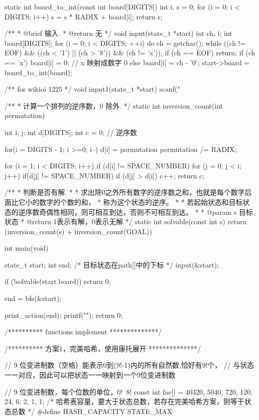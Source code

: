 \begin{Codex}[label=eight_digits_astar.c]
static int board_to_int(const int board[DIGITS]) {
    int i, s = 0;
    for (i = 0; i < DIGITS; i++)
        s = s * RADIX + board[i];
    return s;
}

/**
 * @brief 输入.
 * @return 无
 */
void input(state_t *start) {
    int ch, i;
    int board[DIGITS];
    for (i = 0; i < DIGITS; ++i) {
        do {
            ch = getchar();
        } while ((ch != EOF) && ((ch < '1') || (ch > '8')) && (ch != 'x'));
        if (ch == EOF) return;
        if (ch == 'x') board[i] = 0; // x 映射成数字 0
        else           board[i] = ch - '0';
    }
    start->board = board_to_int(board);
}

/** for wikioi 1225 */
void input1(state_t *start) {
    scanf("%
}

/**
 * 计算一个排列的逆序数，0 除外.
 */
static int inversion_count(int permutation) {
    int i, j;
    int d[DIGITS];
    int c = 0; // 逆序数

    for(i = DIGITS - 1; i >=0; i--) {
        d[i] = permutation %
        permutation /= RADIX;
    }

    for (i = 1; i < DIGITS; i++)  if (d[i] != SPACE_NUMBER) {
        for (j = 0; j < i; j++) {
            if(d[j] != SPACE_NUMBER) {
                if (d[j] > d[i]) {
                    c++;
                }
            }
        }
    }
    return c;
}

/**
 * 判断是否有解.
 *
 * 求出除0之外所有数字的逆序数之和，也就是每个数字后面比它小的数字的个数的和，
 * 称为这个状态的逆序。
 *
 * 若起始状态和目标状态的逆序数奇偶性相同，则可相互到达，否则不可相互到达。
 *
 * @param s 目标状态
 * @return 1表示有解，0表示无解
 */
static int solvable(const int s) {
    return (inversion_count(s) + inversion_count(GOAL)) %
}

int main(void) {
    state_t start;
    int end; /* 目标状态在path[]中的下标 */
    input(&start);

    if (!solvable(start.board)) return 0;

    end = bfs(&start);

    print_action(end);
    printf("\n");
    return 0;
}

/********** functions implement **************/

/********** 方案1，完美哈希，使用康托展开 **************/

// 9 位变进制数（空格）能表示0到(9!-1)内的所有自然数,恰好有9!个，
// 与状态一一对应，因此可以把状态一一映射到一个9位变进制数

// 9 位变进制数，每个位数的单位，0!~8!
const int fac[] = {40320, 5040, 720, 120, 24, 6, 2, 1, 1};
/* 哈希表容量，要大于状态总数，若存在完美哈希方案，则等于状态总数 */
#define HASH_CAPACITY STATE_MAX


\end{Codex}
